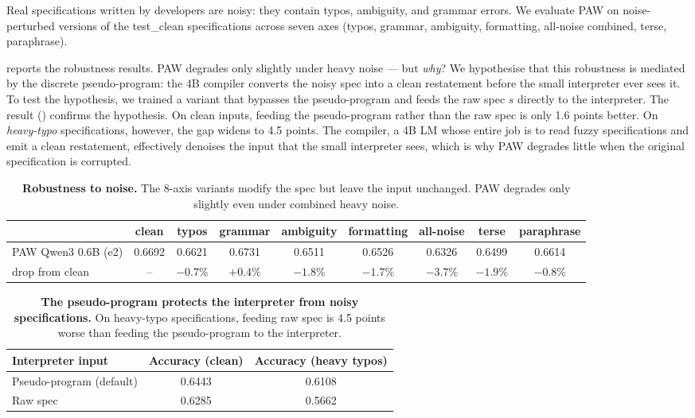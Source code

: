 \documentclass{article}
\theoremstyle{plain}
\theoremstyle{definition}
\theoremstyle{remark}
\begin{document}
Real specifications written by developers are noisy: they contain typos, ambiguity, and grammar errors. We evaluate PAW on noise-perturbed versions of the test\_clean specifications across seven axes (typos, grammar, ambiguity, formatting, all-noise combined, terse, paraphrase).

 reports the robustness results. PAW degrades only slightly under heavy noise --- but \emph{why}? We hypothesise that this robustness is mediated by the discrete pseudo-program: the 4B compiler converts the noisy spec into a clean restatement before the small interpreter ever sees it. To test the hypothesis, we trained a variant that bypasses the pseudo-program and feeds the raw spec $s$ directly to the interpreter. The result () confirms the hypothesis. On clean inputs, feeding the pseudo-program rather than the raw spec is only 1.6 points better. On \emph{heavy-typo} specifications, however, the gap widens to 4.5 points. The compiler, a 4B LM whose entire job is to read fuzzy specifications and emit a clean restatement, effectively denoises the input that the small interpreter sees, which is why PAW degrades little when the original specification is corrupted.



\begin{table}[!t]
\centering
\caption{\label{tab:noise}\textbf{Robustness to noise.} The 8-axis variants modify the spec but leave the input unchanged. PAW degrades only slightly even under combined heavy noise.}
\small
\setlength{\tabcolsep}{4pt}
\begin{tabular}{@{}lcccccccc@{}}
\toprule
& clean & typos & grammar & ambiguity & formatting & all-noise & terse & paraphrase \\
\midrule
PAW Qwen3 0.6B (e2) & 0.6692 & 0.6621 & 0.6731 & 0.6511 & 0.6526 & 0.6326 & 0.6499 & 0.6614 \\
\quad drop from clean & --     & $-0.7\%$ & $+0.4\%$ & $-1.8\%$ & $-1.7\%$ & $-3.7\%$ & $-1.9\%$ & $-0.8\%$ \\
\bottomrule
\end{tabular}
\end{table}


\begin{table}[!t]
\centering
\caption{\label{tab:ablation_pseudo_denoiser}\textbf{The pseudo-program protects the interpreter from noisy specifications.} On heavy-typo specifications, feeding raw spec is 4.5 points worse than feeding the pseudo-program to the interpreter.}
\small
\setlength{\tabcolsep}{8pt}
\begin{tabular}{@{}lcc@{}}
\toprule
Interpreter input & Accuracy (clean) & Accuracy (heavy typos) \\
\midrule
Pseudo-program (default)  & 0.6443 & 0.6108 \\
Raw spec                  & 0.6285 & 0.5662 \\
\bottomrule
\end{tabular}
\end{table}
\end{document}
